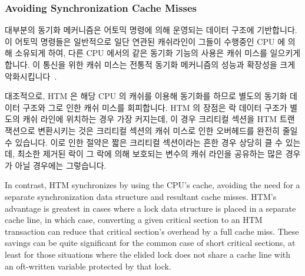 \fi

\subsubsection{Avoiding Synchronization Cache Misses}
\label{sec:future:Avoiding Synchronization Cache Misses}

대부분의 동기화 메커니즘은 어토믹 명령에 의해 운영되는 데이터 구조에
기반합니다.
이 어토믹 명령들은 일반적으로 일단 연관된 캐쉬라인이 그들이 수행중인 CPU 에
의해 소유되게 하여, 다른 CPU 에서의 같은 동기화 기능의 사용은 캐쉬 미스를
일으키게 합니다.
이 통신을 위한 캐쉬 미스는 전통적 동기화 메커니즘의 성능과 확장성을 크게
악화시킵니다~\cite[Section 4.2.3]{Anderson97}.

\iffalse

Most synchronization mechanisms are based on data structures that are
operated on by atomic instructions.
Because these atomic instructions normally operate by first causing
the relevant cache line to be owned by the CPU that they are running on,
a subsequent execution
of the same instance of that synchronization primitive on some other
CPU will result in a cache miss.
These communications cache misses severely degrade both the performance and
scalability of conventional synchronization
mechanisms~\cite[Section 4.2.3]{Anderson97}.

\fi

대조적으로, HTM 은 해당 CPU 의 캐쉬를 이용해 동기화를 하므로 별도의 동기화
데이터 구조와 그로 인한 캐쉬 미스를 회피합니다.
HTM 의 장점은 락 데이터 구조가 별도의 캐쉬 라인에 위치하는 경우 가장 커지는데,
이 경우 크리티컬 섹션을 HTM 트랜잭션으로 변환시키는 것은 크리티컬 섹션의 캐쉬
미스로 인한 오버헤드를 완전히 줄일 수 있습니다.
이로 인한 절약은 짧은 크리티컬 섹션이라는 흔한 경우 상당히 클 수 있는데, 최소한
제거된 락이 그 락에 의해 보호되는 변수의 캐쉬 라인을 공유하는 많은 경우가 아닐
경우에는 그렇습니다.

\iffalse

In contrast, HTM synchronizes by using the CPU's cache, avoiding the need
for a separate synchronization data structure and resultant cache misses.
HTM's advantage is greatest in cases where a lock data structure is
placed in a separate cache line, in which case, converting a given
critical section to an HTM transaction can reduce that critical section's
overhead by a full cache miss.
These savings can be quite significant for the common case of short
critical sections, at least for those situations where the elided lock
does not share a cache line with an oft-written variable protected by
that lock.


